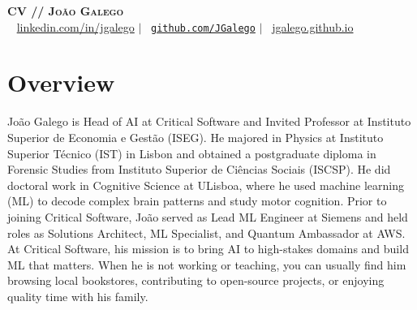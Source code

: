 \documentclass[letterpaper,11pt]{article}
\begin{document}
\begin{center}
    \textbf{\Large \scshape CV // João Galego} \\ \vspace{1pt}
    \small \faLinkedinSquare~
    \href{https://www.linkedin.com/in/jgalego/}{linkedin.com/in/jgalego} $|$ \faGithubSquare~\href{https://github.com/JGalego}{\texttt{github.com/JGalego}} $|$ 
    \faGlobe~\href{https://jgalego.github.io}{jgalego.github.io}
\end{center}


\section{Overview}

\vspace{2mm}

\justifying João Galego is Head of AI at Critical Software and Invited Professor at Instituto Superior de Economia e Gestão (ISEG). He majored in Physics at Instituto Superior Técnico (IST) in Lisbon and obtained a postgraduate diploma in Forensic Studies from Instituto Superior de Ciências Sociais (ISCSP). He did doctoral work in Cognitive Science at ULisboa, where he used machine learning (ML) to decode complex brain patterns and study motor cognition. Prior to joining Critical Software, João served as Lead ML Engineer at Siemens and held roles as Solutions Architect, ML Specialist, and Quantum Ambassador at AWS. At Critical Software, his mission is to bring AI to high-stakes domains and build ML that matters. When he is not working or teaching, you can usually find him browsing local bookstores, contributing to open-source projects, or enjoying quality time with his family.


\end{document}
